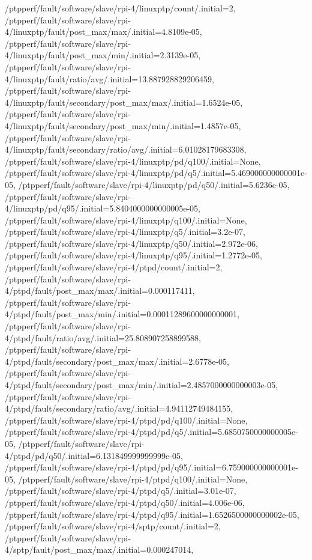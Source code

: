 {    /ptpperf/fault/software/slave/rpi-4/linuxptp/count/.initial=2,
    /ptpperf/fault/software/slave/rpi-4/linuxptp/fault/post_max/max/.initial=4.8109e-05,
    /ptpperf/fault/software/slave/rpi-4/linuxptp/fault/post_max/min/.initial=2.3139e-05,
    /ptpperf/fault/software/slave/rpi-4/linuxptp/fault/ratio/avg/.initial=13.887928829206459,
    /ptpperf/fault/software/slave/rpi-4/linuxptp/fault/secondary/post_max/max/.initial=1.6524e-05,
    /ptpperf/fault/software/slave/rpi-4/linuxptp/fault/secondary/post_max/min/.initial=1.4857e-05,
    /ptpperf/fault/software/slave/rpi-4/linuxptp/fault/secondary/ratio/avg/.initial=6.01028179683308,
    /ptpperf/fault/software/slave/rpi-4/linuxptp/pd/q100/.initial=None,
    /ptpperf/fault/software/slave/rpi-4/linuxptp/pd/q5/.initial=5.469000000000001e-05,
    /ptpperf/fault/software/slave/rpi-4/linuxptp/pd/q50/.initial=5.6236e-05,
    /ptpperf/fault/software/slave/rpi-4/linuxptp/pd/q95/.initial=5.8404000000000005e-05,
    /ptpperf/fault/software/slave/rpi-4/linuxptp/q100/.initial=None,
    /ptpperf/fault/software/slave/rpi-4/linuxptp/q5/.initial=3.2e-07,
    /ptpperf/fault/software/slave/rpi-4/linuxptp/q50/.initial=2.972e-06,
    /ptpperf/fault/software/slave/rpi-4/linuxptp/q95/.initial=1.2772e-05,
    /ptpperf/fault/software/slave/rpi-4/ptpd/count/.initial=2,
    /ptpperf/fault/software/slave/rpi-4/ptpd/fault/post_max/max/.initial=0.000117411,
    /ptpperf/fault/software/slave/rpi-4/ptpd/fault/post_max/min/.initial=0.00011289600000000001,
    /ptpperf/fault/software/slave/rpi-4/ptpd/fault/ratio/avg/.initial=25.808907258899588,
    /ptpperf/fault/software/slave/rpi-4/ptpd/fault/secondary/post_max/max/.initial=2.6778e-05,
    /ptpperf/fault/software/slave/rpi-4/ptpd/fault/secondary/post_max/min/.initial=2.4857000000000003e-05,
    /ptpperf/fault/software/slave/rpi-4/ptpd/fault/secondary/ratio/avg/.initial=4.94112749484155,
    /ptpperf/fault/software/slave/rpi-4/ptpd/pd/q100/.initial=None,
    /ptpperf/fault/software/slave/rpi-4/ptpd/pd/q5/.initial=5.6850750000000005e-05,
    /ptpperf/fault/software/slave/rpi-4/ptpd/pd/q50/.initial=6.131849999999999e-05,
    /ptpperf/fault/software/slave/rpi-4/ptpd/pd/q95/.initial=6.759000000000001e-05,
    /ptpperf/fault/software/slave/rpi-4/ptpd/q100/.initial=None,
    /ptpperf/fault/software/slave/rpi-4/ptpd/q5/.initial=3.01e-07,
    /ptpperf/fault/software/slave/rpi-4/ptpd/q50/.initial=4.006e-06,
    /ptpperf/fault/software/slave/rpi-4/ptpd/q95/.initial=1.6526500000000002e-05,
    /ptpperf/fault/software/slave/rpi-4/sptp/count/.initial=2,
    /ptpperf/fault/software/slave/rpi-4/sptp/fault/post_max/max/.initial=0.000247014,
}
